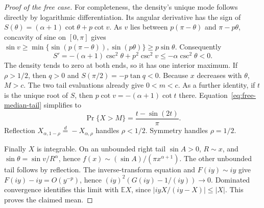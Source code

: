 \documentclass[11pt,a4paper]{article}
\numberwithin{equation}{section}
\begin{document}
\begin{proof}[Proof of the free case]
For completeness, the density's unique mode follows directly by logarithmic differentiation. Its angular derivative has the sign of
$S(\theta)=(\alpha+1)\cot\theta+p\cot v$.
As $v$ lies between $p(\pi-\theta)$ and $\pi-p\theta$,
concavity of sine on $[0,\pi]$ gives
$\sin v\ge\min\{\sin(p(\pi-\theta)),\sin(p\theta)\}\ge p\sin\theta$.
Consequently
\[
 S'=-(\alpha+1)\csc^2\theta+p^2\csc^2 v\le-\alpha\csc^2\theta<0.
\]
The density tends to zero at both ends, so it has one interior maximum. If $\rho>1/2$, then $q>0$ and $S(\pi/2)=-p\tan q<0$. Because $x$ decreases with $\theta$, $M>c$. The two tail evaluations already give $0<m<c$. As a further identity, if $t$ is the unique root of $S$, then $p\cot v=-(\alpha+1)\cot t$ there. Equation~\eqref{eq:free-median-tail} simplifies to
\[
 \Pr\{X>M\}=\frac{t-\sin(2t)}{\pi}.
\]
Reflection $X_{\alpha,1-\rho}\stackrel{d}{=}-X_{\alpha,\rho}$ handles $\rho<1/2$. Symmetry handles $\rho=1/2$.

Finally $X$ is integrable. On an unbounded right tail $\sin A>0$, $R\sim x$, and $\sin\theta=\sin v/R^\alpha$, hence $f(x)\sim (\sin A)/(\pi x^{\alpha+1})$. The other unbounded tail follows by reflection. The inverse-transform equation and $F(iy)\sim iy$ give $F(iy)-iy=O(y^{-p})$, hence $(iy)^2(G(iy)-1/(iy))\to0$. Dominated convergence identifies this limit with $\mathbb E X$, since $|iy X/(iy-X)|\le |X|$. This proves the claimed mean.
\end{proof}
\end{document}

